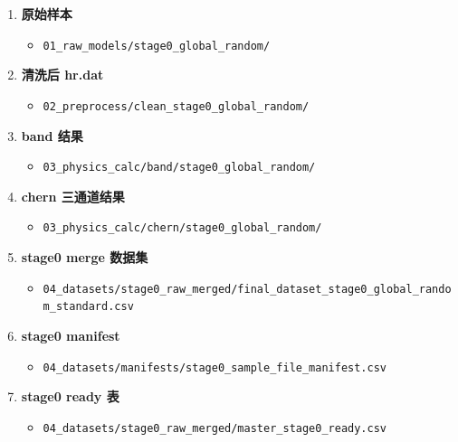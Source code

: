 \documentclass[lang=cn,scheme=chinese,color=blue,device=normal,toc=onecol,math=cm]{elegantbook}
\begin{document}
\begin{enumerate}
\item \textbf{原始样本} 
\begin{itemize}
\item \texttt{01\_\allowbreak{}raw\_\allowbreak{}models/\allowbreak{}stage0\_\allowbreak{}global\_\allowbreak{}random/\allowbreak{}}
\end{itemize}
\item \textbf{清洗后 hr.dat} 
\begin{itemize}
\item \texttt{02\_\allowbreak{}preprocess/\allowbreak{}clean\_\allowbreak{}stage0\_\allowbreak{}global\_\allowbreak{}random/\allowbreak{}}
\end{itemize}
\item \textbf{band 结果} 
\begin{itemize}
\item \texttt{03\_\allowbreak{}physics\_\allowbreak{}calc/\allowbreak{}band/\allowbreak{}stage0\_\allowbreak{}global\_\allowbreak{}random/\allowbreak{}}
\end{itemize}
\item \textbf{chern 三通道结果} 
\begin{itemize}
\item \texttt{03\_\allowbreak{}physics\_\allowbreak{}calc/\allowbreak{}chern/\allowbreak{}stage0\_\allowbreak{}global\_\allowbreak{}random/\allowbreak{}}
\end{itemize}
\item \textbf{stage0 merge 数据集} 
\begin{itemize}
\item \texttt{04\_\allowbreak{}datasets/\allowbreak{}stage0\_\allowbreak{}raw\_\allowbreak{}merged/\allowbreak{}final\_\allowbreak{}dataset\_\allowbreak{}stage0\_\allowbreak{}global\_\allowbreak{}random\_\allowbreak{}standard.csv}
\end{itemize}
\item \textbf{stage0 manifest} 
\begin{itemize}
\item \texttt{04\_\allowbreak{}datasets/\allowbreak{}manifests/\allowbreak{}stage0\_\allowbreak{}sample\_\allowbreak{}file\_\allowbreak{}manifest.csv}
\end{itemize}
\item \textbf{stage0 ready 表} 
\begin{itemize}
\item \texttt{04\_\allowbreak{}datasets/\allowbreak{}stage0\_\allowbreak{}raw\_\allowbreak{}merged/\allowbreak{}master\_\allowbreak{}stage0\_\allowbreak{}ready.csv}

\end{itemize}
\end{enumerate}
\end{document}
